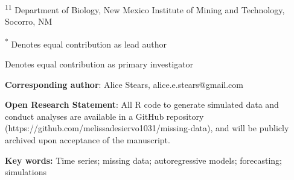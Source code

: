\documentclass[12pt,english]{article} %
\begin{document}
\noindent\textsuperscript{11} Department of Biology, New Mexico Institute of Mining and Technology, Socorro, NM

\noindent\textsuperscript{*} Denotes equal contribution as lead author

\noindent{$^{\circ}$} Denotes equal contribution as primary investigator

\noindent \textbf{Corresponding author}: Alice Stears, alice.e.stears@gmail.com 




\noindent \textbf{Open Research Statement}: All R code to generate simulated data and conduct analyses are available in a GitHub repository (https://github.com/melissadesiervo1031/missing-data), and will be publicly archived upon acceptance of the manuscript. 

\noindent \textbf{Key words:} Time series; missing data; autoregressive models; forecasting; simulations


\clearpage
\end{document}
